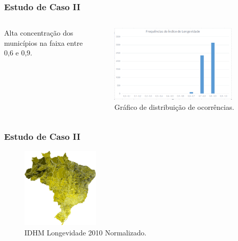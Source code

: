 \documentclass[aspectratio=169]{beamer}
\begin{document}
\begin{frame}
\frametitle{Estudo de Caso II}
\justifying

\begin{columns}
\begin{column}{0.5\textwidth}

Alta concentração dos municípios na faixa entre 0,6 e 0,9.

\end{column}
\begin{column}{0.5\textwidth}

\begin{figure}
\centering
\includegraphics[width=0.93\textwidth]{images/frequencia.png}
\caption{Gráfico de distribuição de ocorrências.}
\end{figure}

\end{column}
\end{columns}

\end{frame}

\begin{frame}
\frametitle{Estudo de Caso II}
\justifying

\begin{figure}
\centering
\includegraphics[width=0.33\textwidth]{images/longevidade-ampliado.png}
\caption{IDHM Longevidade 2010 Normalizado.}
\end{figure}

\end{frame}
\end{document}
